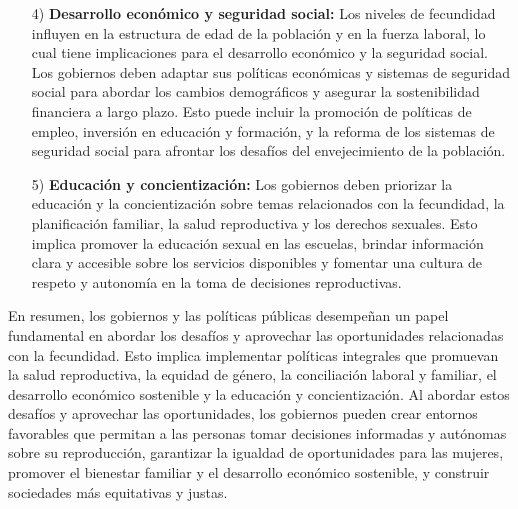 \documentclass[8pt,a4paper]{beamer}
\begin{document}
{\begin{frame}{}
\begin{block}{}
\begin{enumerate}
\item[4)] \textbf{Desarrollo económico y seguridad social:} Los niveles de fecundidad influyen en la estructura de edad de la población y en la fuerza laboral, lo cual tiene implicaciones para el desarrollo económico y la seguridad social. Los gobiernos deben adaptar sus políticas económicas y sistemas de seguridad social para abordar los cambios demográficos y asegurar la sostenibilidad financiera a largo plazo. Esto puede incluir la promoción de políticas de empleo, inversión en educación y formación, y la reforma de los sistemas de seguridad social para afrontar los desafíos del envejecimiento de la población.
\end{enumerate}
\end{block}
\end{frame}


\begin{frame}{}
\begin{block}{}
\setlength{\parskip}{3px}
\justifying
\begin{enumerate}
\setlength{\parskip}{3px}
\justifying
\item[5)] \textbf{Educación y concientización:} Los gobiernos deben priorizar la educación y la concientización sobre temas relacionados con la fecundidad, la planificación familiar, la salud reproductiva y los derechos sexuales. Esto implica promover la educación sexual en las escuelas, brindar información clara y accesible sobre los servicios disponibles y fomentar una cultura de respeto y autonomía en la toma de decisiones reproductivas.
\end{enumerate}
En resumen, los gobiernos y las políticas públicas desempeñan un papel fundamental en abordar los desafíos y aprovechar las oportunidades relacionadas con la fecundidad. Esto implica implementar políticas integrales que promuevan la salud reproductiva, la equidad de género, la conciliación laboral y familiar, el desarrollo económico sostenible y la educación y concientización. Al abordar estos desafíos y aprovechar las oportunidades, los gobiernos pueden crear entornos favorables que permitan a las personas tomar decisiones informadas y autónomas sobre su reproducción, garantizar la igualdad de oportunidades para las mujeres, promover el bienestar familiar y el desarrollo económico sostenible, y construir sociedades más equitativas y justas.
\end{block}
\end{frame}


}
\end{document}
